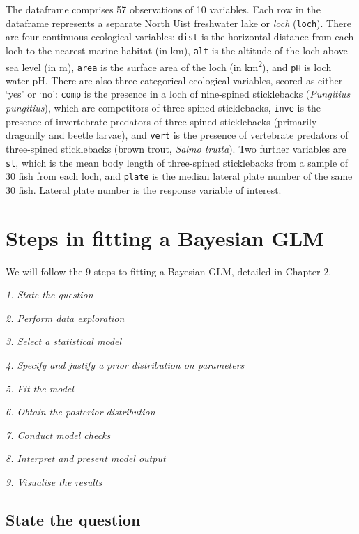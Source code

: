 \documentclass[
]{book}
\begin{document}
The dataframe comprises 57 observations of 10 variables. Each row in the dataframe represents a separate North Uist freshwater lake or \emph{loch} (\texttt{loch}). There are four continuous ecological variables: \texttt{dist} is the horizontal distance from each loch to the nearest marine habitat (in km), \texttt{alt} is the altitude of the loch above sea level (in m), \texttt{area} is the surface area of the loch (in km\textsuperscript{2}), and \texttt{pH} is loch water pH. There are also three categorical ecological variables, scored as either `yes' or `no': \texttt{comp} is the presence in a loch of nine-spined sticklebacks (\emph{Pungitius pungitius}), which are competitors of three-spined sticklebacks, \texttt{inve} is the presence of invertebrate predators of three-spined sticklebacks (primarily dragonfly and beetle larvae), and \texttt{vert} is the presence of vertebrate predators of three-spined sticklebacks (brown trout, \emph{Salmo trutta}). Two further variables are \texttt{sl}, which is the mean body length of three-spined sticklebacks from a sample of 30 fish from each loch, and \texttt{plate} is the median lateral plate number of the same 30 fish. Lateral plate number is the response variable of interest.

\hypertarget{pois-glm-steps}{%
\section{Steps in fitting a Bayesian GLM}\label{pois-glm-steps}}

We will follow the 9 steps to fitting a Bayesian GLM, detailed in Chapter 2.

\emph{1. State the question}

\emph{2. Perform data exploration}

\emph{3. Select a statistical model}

\emph{4. Specify and justify a prior distribution on parameters}

\emph{5. Fit the model}

\emph{6. Obtain the posterior distribution}

\emph{7. Conduct model checks}

\emph{8. Interpret and present model output}

\emph{9. Visualise the results}

\hypertarget{ga-question}{%
\subsection{State the question}\label{ga-question}}
\end{document}
